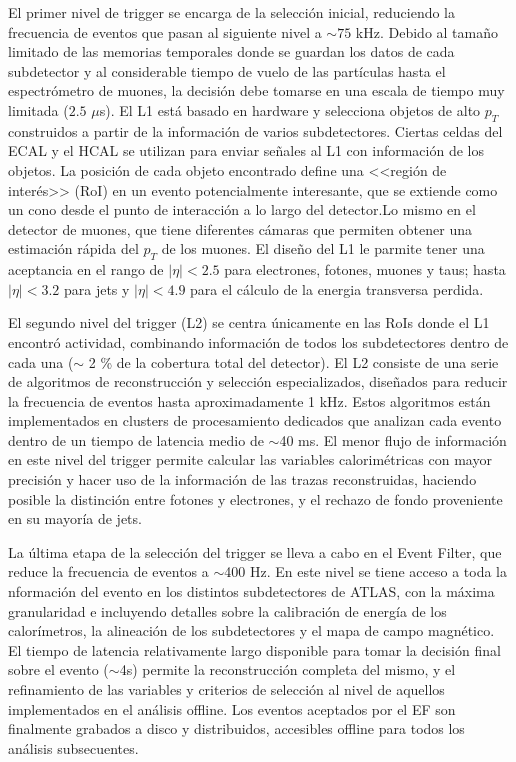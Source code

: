 El primer nivel de trigger se encarga de la selección inicial, reduciendo la frecuencia de eventos que pasan al siguiente nivel a $\sim 75$ kHz. Debido al tamaño limitado de las memorias temporales donde se guardan los datos de cada subdetector y al considerable tiempo de vuelo de las partículas hasta el espectrómetro de muones, la decisión debe tomarse en una escala de tiempo muy limitada ($2.5$ $\mu$s). El L1 está basado en hardware y selecciona objetos de alto $p_{T}$ construidos a partir de la información de varios subdetectores. Ciertas celdas del ECAL y el HCAL se utilizan para enviar señales al L1 con información de los objetos. La posición de cada objeto encontrado define una <<región de interés>> (RoI) en un evento potencialmente interesante, que se extiende como un
cono desde el punto de interacción a lo largo del detector.Lo mismo en el detector de muones, que tiene diferentes cámaras que permiten obtener una estimación rápida del $p_{T}$ de los muones. El diseño del L1 le parmite tener una aceptancia en el rango de $|\eta|<2.5$ para electrones, fotones, muones y taus; hasta $|\eta|<3.2$ para jets y $|\eta|<4.9$ para el cálculo de la energia transversa perdida.

El segundo nivel del trigger (L2) se centra únicamente en las RoIs donde el L1 encontró actividad, combinando información de todos los subdetectores dentro de cada una ($\sim$ 2 \% de la cobertura total del detector). El L2 consiste de una serie de algoritmos de reconstrucción y selección especializados, diseñados para reducir la frecuencia de eventos hasta aproximadamente 1 kHz. Estos algoritmos están implementados en clusters de procesamiento dedicados que analizan cada evento dentro de un tiempo de latencia medio de $\sim$40 ms. El menor flujo de información en este nivel del trigger permite calcular las variables calorimétricas con mayor precisión y hacer uso de la información de las trazas reconstruidas, haciendo posible la distinción entre fotones y electrones, y el rechazo de fondo proveniente en su mayoría de jets.

La última etapa de la selección del trigger se lleva a cabo en el Event Filter, que reduce la frecuencia de eventos a $\sim$400 Hz. En este nivel se tiene acceso a toda la  nformación del evento en los distintos subdetectores de ATLAS, con la máxima granularidad e incluyendo detalles sobre la calibración de energía de los calorímetros, la alineación de los subdetectores y el mapa de campo magnético. El tiempo de latencia relativamente largo disponible para tomar la decisión final sobre el evento ($\sim$4s) permite la reconstrucción completa del mismo, y el refinamiento de las variables y criterios de selección al nivel de aquellos implementados en el análisis offline. Los eventos aceptados por el EF son finalmente grabados a disco y distribuidos, accesibles offline para todos los análisis subsecuentes.

